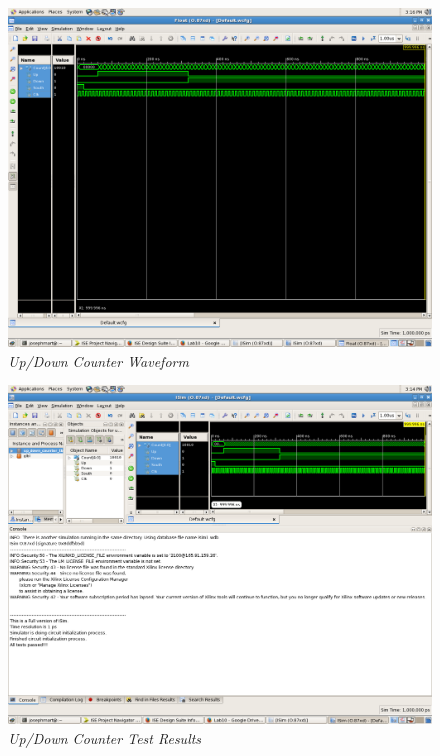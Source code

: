 \documentclass[a4paper,12pt]{article}
\begin{document}
\newpage

\begin{figure}[h]
  \begin{center}
    \includegraphics[scale=.1]{UpDownCountWaveForm.png}
    \caption{\textit{Up/Down Counter Waveform}}
  \end{center}
\end{figure}

\begin{figure}[h]
  \begin{center}
    \includegraphics[scale=.1]{UpDownCountTests.png}
    \caption{\textit{Up/Down Counter Test Results}}
  \end{center}
\end{figure}
\end{document}
